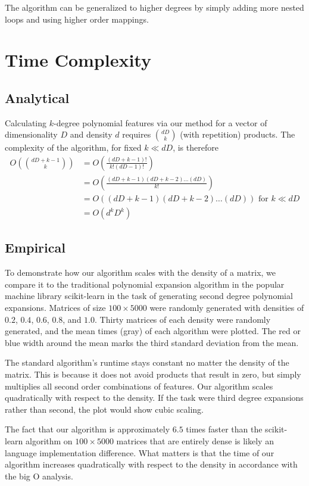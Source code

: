 \documentclass{article} %
\begin{document}
The algorithm can be generalized to higher degrees by simply adding more nested loops and using higher order mappings.


\section{Time Complexity}
\subsection{Analytical}

Calculating $k$-degree polynomial features via our method for a vector of dimensionality $D$ and density $d$ requires $\binom{dD}{k}$ (with repetition) products.
The complexity of the algorithm, for fixed $k \ll dD$, is therefore
\begin{align}
O\left(\binom{dD+k-1}{k}\right) & = O\left(\frac{(dD+k-1)!}{k!(dD-1)!}\right)\\
& = O\left(\frac{(dD+k-1)(dD+k-2) \dots (dD)}{k!}\right)\\
& = O\left((dD+k-1)(dD+k-2) \dots (dD)\right) \mbox{ for } k \ll dD\\
& = O\left(d^kD^k\right)
\end{align}

\subsection{Empirical}
To demonstrate how our algorithm scales with the density of a matrix, we compare it to the traditional polynomial expansion algorithm in the popular machine library scikit-learn \cite{scikit-learn} in the task of generating second degree polynomial expansions.
Matrices of size $100 \times 5000$ were randomly generated with densities of $0.2$, $0.4$, $0.6$, $0.8$, and $1.0$.
Thirty matrices of each density were randomly generated, and the mean times (gray) of each algorithm were plotted.
The red or blue width around the mean marks the third standard deviation from the mean.

The standard algorithm's runtime stays constant no matter the density of the matrix.
This is because it does not avoid products that result in zero, but simply multiplies all second order combinations of features.
Our algorithm scales quadratically with respect to the density.
If the task were third degree expansions rather than second, the plot would show cubic scaling.

The fact that our algorithm is approximately $6.5$ times faster than the scikit-learn algorithm on $100 \times 5000$ matrices that are entirely dense is likely an language implementation difference.
What matters is that the time of our algorithm increases quadratically with respect to the density in accordance with the big O analysis.
\end{document}
